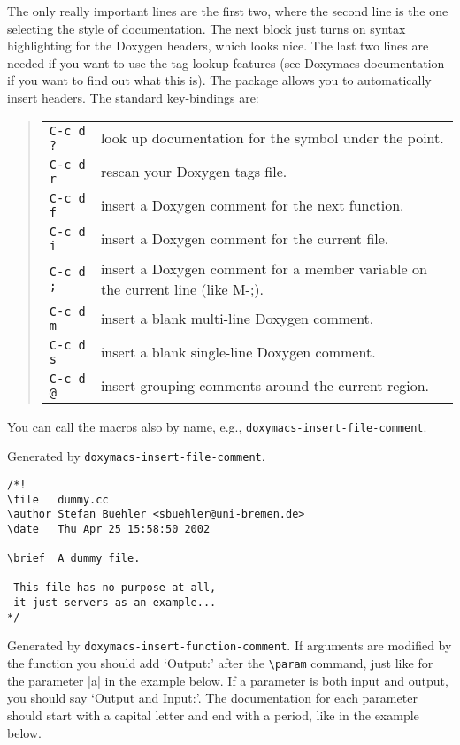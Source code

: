 The only really important lines are the first two, where the second
line is the one selecting the style of documentation. The next block
just turns on syntax highlighting for the Doxygen headers, which looks
nice. The last two lines are needed if you want to use the tag lookup
features (see Doxymacs documentation if you want to find out what this
is).  The package allows you to automatically insert headers. The
standard key-bindings are:
\begin{quote}
\begin{tabularx}{.8\hsize}{@{}lX}
\texttt{C-c d ?} & look up documentation for the symbol under the point.\\
\texttt{C-c d r} & rescan your Doxygen tags file.\\
\texttt{C-c d f} & insert a Doxygen comment for the next function.\\
\texttt{C-c d i} & insert a Doxygen comment for the current file.\\
\texttt{C-c d ;} & insert a Doxygen comment for a member variable on the current line (like M-;).\\
\texttt{C-c d m} & insert a blank multi-line Doxygen comment.\\
\texttt{C-c d s} & insert a blank single-line Doxygen comment.\\
\texttt{C-c d @} & insert grouping comments around the current region.\\
\end{tabularx}
\end{quote}
You can call the macros also by name, e.g., \verb|doxymacs-insert-file-comment|.


Generated by \verb|doxymacs-insert-file-comment|.

\begin{verbatim}
/*!
\file   dummy.cc
\author Stefan Buehler <sbuehler@uni-bremen.de>
\date   Thu Apr 25 15:58:50 2002

\brief  A dummy file.

 This file has no purpose at all,
 it just servers as an example... 
*/
\end{verbatim}


Generated by \verb|doxymacs-insert-function-comment|.
If arguments are modified by the function you should
add `Output:' after the \verb|\param| command, just like for the
parameter \verv|a| in the example below. If a parameter is both input
and output, you should say `Output and Input:'. The documentation for
each parameter should start with a capital letter and end with a
period, like in the example below.

